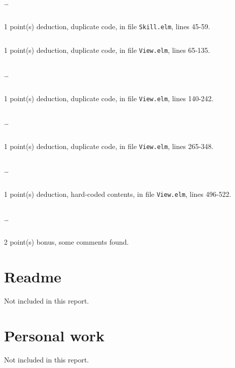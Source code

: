 \documentclass{article}
\begin{document}
\inputminted[firstline=192,lastline=201]{elm}{Model.elm}

\dots

\inputminted[firstline=211,lastline=220]{elm}{Model.elm}

1 point(s) {\color{red}deduction}, duplicate code, in file {\color{blue}\texttt{Skill.elm}}, lines {\color{blue}45-59}.

\inputminted[firstline=45,lastline=59]{elm}{Skill.elm}

1 point(s) {\color{red}deduction}, duplicate code, in file {\color{blue}\texttt{View.elm}}, lines {\color{blue}65-135}.

\inputminted[firstline=65,lastline=74]{elm}{View.elm}

\dots

\inputminted[firstline=126,lastline=135]{elm}{View.elm}

1 point(s) {\color{red}deduction}, duplicate code, in file {\color{blue}\texttt{View.elm}}, lines {\color{blue}140-242}.

\inputminted[firstline=140,lastline=149]{elm}{View.elm}

\dots

\inputminted[firstline=233,lastline=242]{elm}{View.elm}

1 point(s) {\color{red}deduction}, duplicate code, in file {\color{blue}\texttt{View.elm}}, lines {\color{blue}265-348}.

\inputminted[firstline=265,lastline=274]{elm}{View.elm}

\dots

\inputminted[firstline=339,lastline=348]{elm}{View.elm}

1 point(s) {\color{red}deduction}, hard-coded contents, in file {\color{blue}\texttt{View.elm}}, lines {\color{blue}496-522}.

\inputminted[firstline=496,lastline=505]{elm}{View.elm}

\dots

\inputminted[firstline=513,lastline=522]{elm}{View.elm}

2 point(s) {\color{red}bonus}, some comments found.\medskip



\newpage

\section{Readme}

Not included in this report.

\section{Personal work}

Not included in this report.


\newpage
\end{document}
